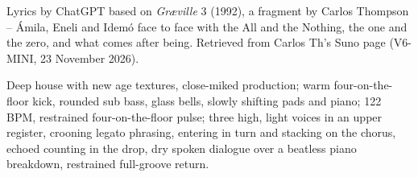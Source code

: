 
\begin{notes}
Lyrics by ChatGPT based on \emph{Gr\ae ville} 3 (1992), a fragment by Carlos Thompson -- Ámila, Eneli and Idemó face to face with the All and the Nothing, the one and the zero, and what comes after being. Retrieved from Carlos Th's Suno page (V6-MINI, 23 November 2026).
\end{notes}
\begin{style}
Deep house with new age textures, close-miked production; warm four-on-the-floor kick, rounded sub bass, glass bells, slowly shifting pads and piano; 122 BPM, restrained four-on-the-floor pulse; three high, light voices in an upper register, crooning legato phrasing, entering in turn and stacking on the chorus, echoed counting in the drop, dry spoken dialogue over a beatless piano breakdown, restrained full-groove return.
\end{style}
